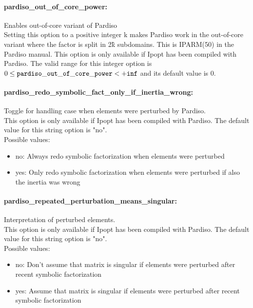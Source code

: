 \paragraph{pardiso\_out\_of\_core\_power:}\label{opt:pardiso_out_of_core_power} Enables out-of-core variant of Pardiso \\
 Setting this option to a positive integer k makes Pardiso work in the out-of-core variant where the factor is split in 2\^k subdomains.  This is IPARM(50) in the Pardiso manual.  This option is only available if Ipopt has been compiled with Pardiso. The valid range for this integer option is
$0 \le {\tt pardiso\_out\_of\_core\_power } <  {\tt +inf}$
and its default value is $0$.


\paragraph{pardiso\_redo\_symbolic\_fact\_only\_if\_inertia\_wrong:}\label{opt:pardiso_redo_symbolic_fact_only_if_inertia_wrong} Toggle for handling case when elements were perturbed by Pardiso. \\
 This option is only available if Ipopt has been compiled with Pardiso. The default value for this string option is "no".
\\ 
Possible values:
\begin{itemize}
   \item no: Always redo symbolic factorization when elements were perturbed
   \item yes: Only redo symbolic factorization when elements were perturbed if also the inertia was wrong
\end{itemize}

\paragraph{pardiso\_repeated\_perturbation\_means\_singular:}\label{opt:pardiso_repeated_perturbation_means_singular} Interpretation of perturbed elements. \\
 This option is only available if Ipopt has been compiled with Pardiso. The default value for this string option is "no".
\\ 
Possible values:
\begin{itemize}
   \item no: Don't assume that matrix is singular if elements were perturbed after recent symbolic factorization
   \item yes: Assume that matrix is singular if elements were perturbed after recent symbolic factorization
\end{itemize}

